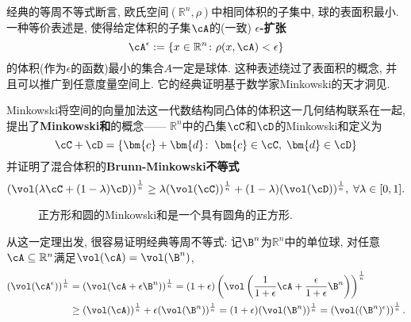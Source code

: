 经典的等周不等式断言, 欧氏空间$(\mathbb{R}^n, \rho)$中相同体积的子集中, 球的表面积最小. 
一种等价表述是, 使得给定体积的子集$\cA$的(一致) \textbf{$\epsilon$-扩张}
\begin{equation*}
	\cA^{\epsilon} := \left\{ x \in \mathbb{R}^n \colon \rho(x, \cA) < \epsilon \right\}
\end{equation*}
的体积(作为$\epsilon$的函数)最小的集合$A$一定是球体.  
这种表述绕过了表面积的概念, 并且可以推广到任意度量空间上. 
它的经典证明基于数学家Minkowski的天才洞见. 

Minkowski将空间的向量加法这一代数结构同凸体的体积这一几何结构联系在一起, 提出了\textbf{Minkowski和}的概念——
$\mathbb{R}^n$中的凸集$\cC$和$\cD$的Minkowski和定义为
\begin{equation*}
	\cC + \cD = \{\bm{c} + \bm{d} \colon\: \bm{c} \in \cC,\; \bm{d} \in \cD\} 
\end{equation*}
并证明了混合体积的\textbf{Brunn-Minkowski不等式}
\begin{equation*}
	\left( \vol(\lambda \cC + (1-\lambda) \cD)  \right)^{\frac1n}
	\geq \lambda (\vol(\cC))^{\frac1n} + (1-\lambda) (\vol(\cD))^{\frac1n},\;
	\forall \lambda \in [0,1]. 
\end{equation*}
\begin{figure}[H]
	\centering
	\caption{正方形和圆的Minkowski和是一个具有圆角的正方形.}
\end{figure}
\noindent
从这一定理出发, 很容易证明经典等周不等式: 记$\B^n$为$\mathbb{R}^n$中的单位球, 对任意$\cA \subseteq \mathbb{R}^n$满足$\vol(\cA) = \vol(\B^n)$, 
\begin{align*}
	(\vol(\cA^{\epsilon}))^{\frac1n}
	&= (\vol(\cA + \epsilon \B^n))^{\frac1n}
	= (1+\epsilon) \left(\vol\left(\frac{1}{1+\epsilon} \cA + \frac{\epsilon}{1+\epsilon} \B^n\right)\right)^{\frac1n} \\
	&\geq (\vol(\cA))^{\frac1n} + \epsilon (\vol(\B^n))^{\frac1n} 
	= (1+\epsilon) (\vol(\B^n))^{\frac1n} 
	= \left( \vol((\B^n)^{\epsilon}) \right)^{\frac1n}. 
\end{align*}

